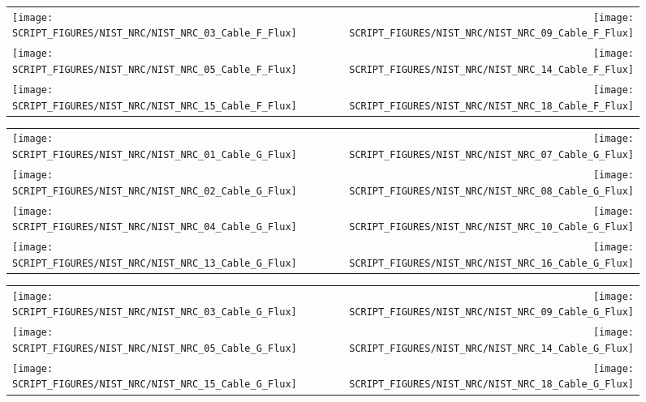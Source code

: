 \begin{figure}[p]
\begin{tabular*}{\textwidth}{l@{\extracolsep{\fill}}r}
\texttt{[image: SCRIPT\_FIGURES/NIST\_NRC/NIST\_NRC\_03\_Cable\_F\_Flux]} &
\texttt{[image: SCRIPT\_FIGURES/NIST\_NRC/NIST\_NRC\_09\_Cable\_F\_Flux]} \\
\texttt{[image: SCRIPT\_FIGURES/NIST\_NRC/NIST\_NRC\_05\_Cable\_F\_Flux]} &
\texttt{[image: SCRIPT\_FIGURES/NIST\_NRC/NIST\_NRC\_14\_Cable\_F\_Flux]} \\
\texttt{[image: SCRIPT\_FIGURES/NIST\_NRC/NIST\_NRC\_15\_Cable\_F\_Flux]} &
\texttt{[image: SCRIPT\_FIGURES/NIST\_NRC/NIST\_NRC\_18\_Cable\_F\_Flux]}
\end{tabular*}
\label{NIST_NRC_Cable_F_Flux_Open}
\end{figure}

\begin{figure}[p]
\begin{tabular*}{\textwidth}{l@{\extracolsep{\fill}}r}
\texttt{[image: SCRIPT\_FIGURES/NIST\_NRC/NIST\_NRC\_01\_Cable\_G\_Flux]} &
\texttt{[image: SCRIPT\_FIGURES/NIST\_NRC/NIST\_NRC\_07\_Cable\_G\_Flux]} \\
\texttt{[image: SCRIPT\_FIGURES/NIST\_NRC/NIST\_NRC\_02\_Cable\_G\_Flux]} &
\texttt{[image: SCRIPT\_FIGURES/NIST\_NRC/NIST\_NRC\_08\_Cable\_G\_Flux]} \\
\texttt{[image: SCRIPT\_FIGURES/NIST\_NRC/NIST\_NRC\_04\_Cable\_G\_Flux]} &
\texttt{[image: SCRIPT\_FIGURES/NIST\_NRC/NIST\_NRC\_10\_Cable\_G\_Flux]} \\
\texttt{[image: SCRIPT\_FIGURES/NIST\_NRC/NIST\_NRC\_13\_Cable\_G\_Flux]} &
\texttt{[image: SCRIPT\_FIGURES/NIST\_NRC/NIST\_NRC\_16\_Cable\_G\_Flux]}
\end{tabular*}
\label{NIST_NRC_Cable_G_Flux_Closed}
\end{figure}

\begin{figure}[p]
\begin{tabular*}{\textwidth}{l@{\extracolsep{\fill}}r}
\texttt{[image: SCRIPT\_FIGURES/NIST\_NRC/NIST\_NRC\_03\_Cable\_G\_Flux]} &
\texttt{[image: SCRIPT\_FIGURES/NIST\_NRC/NIST\_NRC\_09\_Cable\_G\_Flux]} \\
\texttt{[image: SCRIPT\_FIGURES/NIST\_NRC/NIST\_NRC\_05\_Cable\_G\_Flux]} &
\texttt{[image: SCRIPT\_FIGURES/NIST\_NRC/NIST\_NRC\_14\_Cable\_G\_Flux]} \\
\texttt{[image: SCRIPT\_FIGURES/NIST\_NRC/NIST\_NRC\_15\_Cable\_G\_Flux]} &
\texttt{[image: SCRIPT\_FIGURES/NIST\_NRC/NIST\_NRC\_18\_Cable\_G\_Flux]}
\end{tabular*}
\label{NIST_NRC_Cable_G_Flux_Open}
\end{figure}

